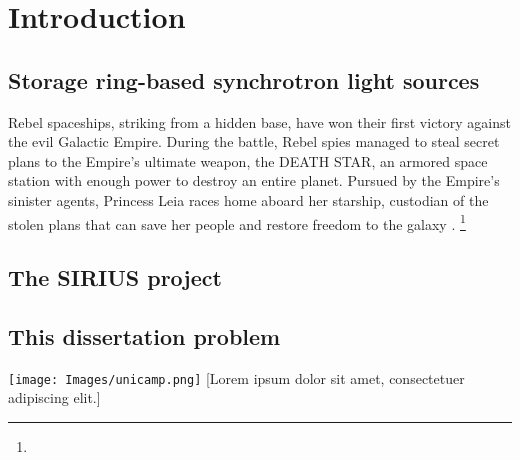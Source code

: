 \chapter{Introduction}
\section{Storage ring-based synchrotron light sources}
Rebel spaceships, striking from a hidden base, have won
their first victory against the evil Galactic Empire.
During the battle, Rebel spies managed to steal secret
plans to the Empire's ultimate weapon, the DEATH STAR,
an armored space station with enough power to destroy
an entire planet. Pursued by the Empire's sinister
agents, Princess Leia races home aboard her starship,
custodian of the stolen plans that can save her people
and restore freedom to the galaxy \cite{bib_skywalker77, bib_vader77, bib_kenobi77}.
\footnote{\lipsum[1]}
\lipsum[1-3]

\section{The SIRIUS project}
\lipsum[1-3]

\section{This dissertation problem}
\lipsum[1-3]

\begin{center}
\texttt{[image: Images/unicamp.png]}
[Lorem ipsum dolor sit amet, consectetuer adipiscing elit.]{\lipsum[1]}
\end{center}

\lipsum[1-3]

\begin{longcitation}
\lipsum[1]
\end{longcitation}

\lipsum[4-10]

